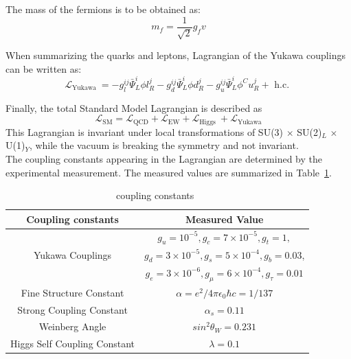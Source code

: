The mass of the fermions is to be obtained as:
\begin{equation}
m_{f}=\frac{1}{\sqrt{2}} g_{f} v
\end{equation}

When summarizing the quarks and leptons, Lagrangian of the Yukawa couplings can be written as:
\begin{equation}
\mathcal{L}_{\text {Yukawa }}=-g_{l}^{i j} \bar{\Psi}_{L}^{i} \phi l_{R}^{j}-g_{d}^{i j} \bar{\Psi}_{L}^{i} \phi d_{R}^{j}-g_{u}^{i j} \bar{\Psi}_{L}^{i} \phi^{C} u_{R}^{j}+\text { h.c. }
\end{equation}

Finally, the total Standard Model Lagrangian is described as 
\begin{equation}
\mathcal{L}_{\mathrm{SM}}=\mathcal{L}_{\mathrm{QCD}}+\mathcal{L}_{\mathrm{EW}}+\mathcal{L}_{\text {Higgs }}+\mathcal{L}_{\text {Yukawa}}
\end{equation}
This Lagrangian is invariant under local transformations of SU(3) $\times$ SU(2)$_L$ $\times$ U(1)$_Y$, while the vacuum is breaking the symmetry and not invariant. \\

The coupling constants appearing in the Lagrangian are determined by the experimental measurement. 
The measured values are summarized in Table~\ref{tab:constants}.  \\

\begin{center}
\begin{table}
\centering
\begin{tabular}{|c|c|}
\hline
Coupling constants & Measured Value \\
\hline 
                             & $g_{u}=10^{-5}, g_{c}=7 \times 10^{-5}, g_{t}=1,$ \\
            Yukawa Couplings & $g_{d}=3 \times 10^{-5}, g_{s}=5 \times 10^{-4}, g_{b}=0.03$, \\
                             & $g_{e}=3 \times 10^{-6}, g_{\mu}=6 \times 10^{-4}, g_{\tau}=0.01$ \\
     Fine Structure Constant & $\alpha= e^2 / 4 \pi \epsilon_0 \hbar c = 1 / 137$ \\
    Strong Coupling Constant & $\alpha_{s}=0.11$ \\
              Weinberg Angle & $sin^{2} \theta_{W}=0.231$ \\
Higgs Self Coupling Constant & $\lambda=0.1$ \\
\hline
\end{tabular}
\caption{coupling constants~\cite{PhysRevD.98.030001}}
\label{tab:constants}
\end{table}
\end{center}

